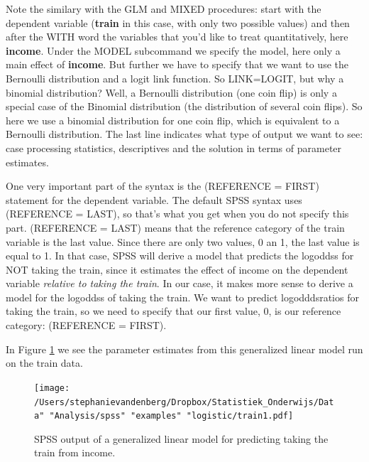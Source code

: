 \documentclass[]{report}\usepackage[]{graphicx}\usepackage[]{color}
\begin{document}
Note the similary with the GLM and MIXED procedures: start with the dependent variable (\textbf{train} in this case, with only two possible values) and then after the WITH word the variables that you'd like to treat quantitatively, here \textbf{income}. Under the MODEL subcommand we specify the model, here only a main effect of \textbf{income}. But further we have to specify that we want to use the Bernoulli distribution and a logit link function. So LINK=LOGIT, but why a binomial distribution? Well, a Bernoulli distribution (one coin flip) is only a special case of the Binomial distribution (the distribution of several coin flips). So here we use a binomial distribution for one coin flip, which is equivalent to a Bernoulli distribution. The last line indicates what type of output we want to see: case processing statistics, descriptives and the solution in terms of parameter estimates.

One very important part of the syntax is the (REFERENCE = FIRST) statement for the dependent variable. The default SPSS syntax uses (REFERENCE = LAST), so that's what you get when you do not specify this part. (REFERENCE = LAST) means that the reference category of the train variable is the last value. Since there are only two values, 0 an 1, the last value is equal to 1. In that case, SPSS will derive a model that predicts the logoddss for NOT taking the train, since it estimates the effect of income on the dependent variable \textit{relative to taking the train}. In our case, it makes more sense to derive a model for the logoddss of taking the train. We want to predict logodddsratios for taking the train, so we need to specify that our first value, 0, is our reference category: (REFERENCE = FIRST).


In Figure \ref{fig:train1} we see the parameter estimates from this generalized linear model run on the train data.


\begin{figure}[h]
    \begin{center}
       \texttt{[image: /Users/stephanievandenberg/Dropbox/Statistiek\_Onderwijs/Data" "Analysis/spss" "examples" "logistic/train1.pdf]}
    \end{center}
     \caption{SPSS output of a generalized linear model for predicting taking the train from income.}
    \label{fig:train1}
\end{figure}
\end{document}
